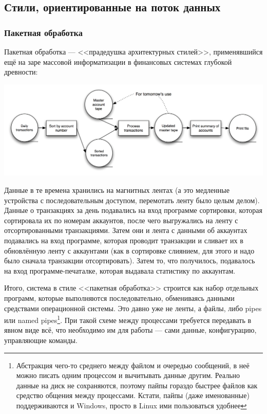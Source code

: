 \documentclass{../../text-style}
\begin{document}
\subsection{Стили, ориентированные на поток данных}

\subsubsection{Пакетная обработка}

Пакетная обработка --- <<прадедушка архитектурных стилей>>, применявшийся ещё на заре массовой информатизации в финансовых системах глубокой древности:

\begin{center}
    \includegraphics[width=\textwidth]{batch.png}
\end{center}

Данные в те времена хранились на магнитных лентах (а это медленные устройства с последовательным доступом, перемотать ленту было целым делом). Данные о транзакциях за день подавались на вход программе сортировки, которая сортировала их по номерам аккаунтов, после чего выгружались на ленту с отсортированными транзакциями. Затем они и лента с данными об аккаунтах подавались на вход программе, которая проводит транзакции и сливает их в обновлённую ленту с аккаунтами (как в сортировке слиянием, для этого и надо было сначала транзакции отсортировать). Затем то, что получилось, подавалось на вход программе-печаталке, которая выдавала статистику по аккаунтам.

Итого, система в стиле <<пакетная обработка>> строится как набор отдельных программ, которые выполняются последовательно, обмениваясь данными средствами операционной системы. Это давно уже не ленты, а файлы, либо pipes или named pipes\footnote{Абстракция чего-то среднего между файлом и очередью сообщений, в неё можно писать одним процессом и вычитывать данные другим. Реально данные на диск не сохраняются, поэтому пайпы гораздо быстрее файлов как средство общения между процессами. Кстати, пайпы (даже именованные) поддерживаются и Windows, просто в Linux ими пользоваться удобнее}. При такой схеме между процессами требуется передавать в явном виде всё, что необходимо им для работы --- сами данные, конфигурацию, управляющие команды.
\end{document}
